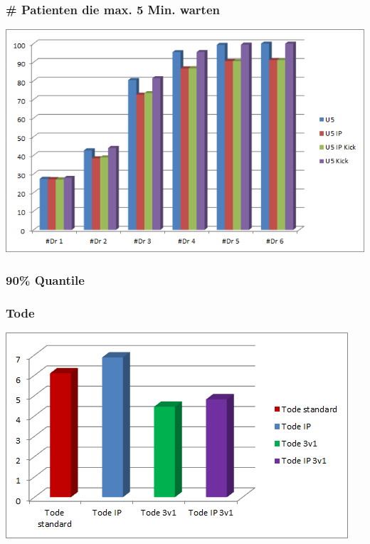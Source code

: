 \documentclass{beamer}
\begin{document}
\begin{frame}
	\frametitle{\# Patienten die max. 5 Min. warten}
	\begin{center}
		\includegraphics[scale=0.6]{img/U5.png}
	\end{center}
\end{frame}



\begin{frame}
	\frametitle{90\% Quantile}
\end{frame}

\begin{frame}
	\frametitle{Tode}
	\begin{center}
		\includegraphics[scale=0.77]{img/Deaths.png}
	\end{center}
\end{frame}
\end{document}
